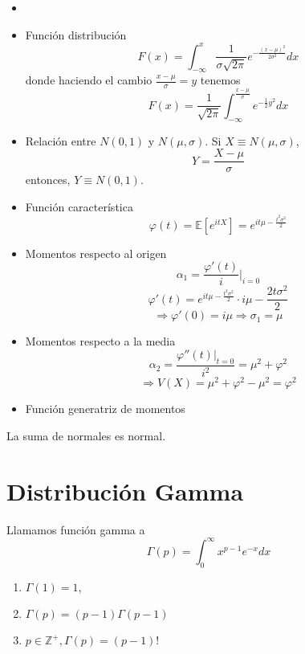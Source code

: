 \begin{prop}
  \begin{itemize}
    \item []
    \item Función distribución
      \[ 
        F(x) = \int_{-\infty}^{x} \frac{1}{\sigma \sqrt{2 \pi}} e^{-\frac{(x -\mu)^{2}}{2 \sigma^{2}}} dx
      \] 
      donde haciendo el cambio $\frac{x - \mu}{\sigma} = y$ tenemos
      \[ 
        F(x) = \frac{1}{\sqrt{2 \pi}} \int_{- \infty}^{\frac{x - \mu}{\sigma}} e^{-\frac{1}{2}y^{2}} dx
      \] 
    \item Relación entre $N(0,1)$ y $N(\mu, \sigma)$. Si $X \equiv N(\mu, \sigma)$,
      \[ 
        Y = \frac{X - \mu}{\sigma}
      \] 
      entonces, $Y \equiv N(0, 1)$.
    \item Función característica
      \[ 
        \varphi(t) =\mathbb{E} [ e^{itX} ] = e^{it \mu - \frac{t^{2}\sigma^{2}}{2}}
      \] 
    \item Momentos respecto al origen
      \[ 
        \alpha_{1} = \frac{\varphi'(t)}{i} \Big|_{i = 0}^{} 
      \] 
      \[ 
        \varphi'(t) = e^{it \mu - \frac{t^{2} \sigma^{2}}{2}} \cdot i \mu - \frac{2t \sigma^{2}}{2} 
      \] 
      \[ 
        \Rightarrow \varphi'(0) = i \mu  \Rightarrow \sigma_{1} = \mu
      \] 
    \item Momentos respecto a la media
      \[ 
        \alpha_{2} = \frac{\varphi''(t)|_{t = 0}}{i^{2}} = \mu^{2} + \varphi^{2}
      \] 
      \[ 
        \Rightarrow V(X) = \mu^{2} + \varphi^{2} - \mu^{2} = \varphi^{2} 
      \] 
    \item Función generatriz de momentos
  \end{itemize}
\end{prop}

\begin{theo}
  La suma de normales es normal.
\end{theo}

\section{Distribución Gamma}

\begin{defn}
  Llamamos función gamma a
  \[ 
    \Gamma(p) = \int_{0}^{\infty} x^{p-1} e^{-x} dx 
  \] 
\end{defn}

\begin{prop}[Propiedades]
  \begin{enumerate}[label=(\roman*)]
    \item $\Gamma(1) = 1$,
    \item $\Gamma(p) = (p - 1) \Gamma(p - 1)$
    \item $p \in \mathbb{Z}^{+}, \Gamma(p) = (p - 1)!$
  \end{enumerate}
\end{prop}

